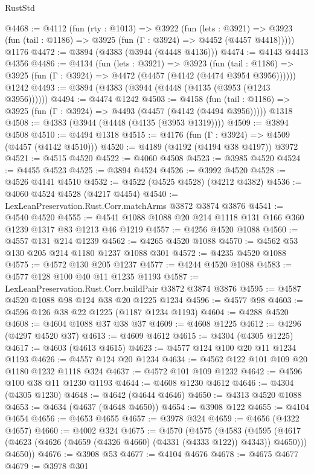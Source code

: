 \begin{lexlean}{RustStd}
\begin{coremodule}
@4468 := @4112
    (fun (rty : @1013) =>
    @3922
      (fun (lets : @3921) =>
      @3923 (fun (tail : @1186) => @3925 (fun (Γ : @3924) => @4452 (@4457 @4418)))))
    @1176
@4472 := @3894 (@4383 (@3944 (@4448 @4136)))
@4474 := @4143 @4413 @4356
@4486 := @4134
    (fun (lets : @3921) =>
    @3923
      (fun (tail : @1186) => @3925 (fun (Γ : @3924) => @4472 (@4457 (@4142 (@4474 @3954 @3956))))))
    @1242
@4493 := @3894 (@4383 (@3944 (@4448 (@4135 (@3953 (@1243 @3956))))))
@4494 := @4474 @1242
@4503 := @4158
    (fun (tail : @1186) => @3925 (fun (Γ : @3924) => @4493 (@4457 (@4142 (@4494 @3956)))))
    @1318
@4508 := @4383 (@3944 (@4448 (@4135 (@3953 @1319))))
@4509 := @3894 @4508
@4510 := @4494 @1318
@4515 := @4176 (fun (Γ : @3924) => @4509 (@4457 (@4142 @4510)))
@4520 := @4189 (@4192 (@4194 @38 @4197)) @3972
@4521 := @4515 @4520
@4522 := @4060 @4508
@4523 := @3985 @4520
@4524 := @4455 @4523
@4525 := @3894 @4524
@4526 := @3992 @4520
@4528 := @4526 @4141 @4510
@4532 := @4522 (@4525 @4528) (@4212 @4382)
@4536 := @4060 @4524 @4528 (@4217 @4454)
@4540 := LexLeanPreservation.Rust.Corr.matchArms @3872 @3874 @3876
@4541 := @4540 @4520
@4555 := @4541 @1088 @1088 @20 @214 @1118 @131 @166 @360 @1239 @1317 @83 @1213 @46 @1219
@4557 := @4256 @4520 @1088
@4560 := @4557 @131 @214 @1239
@4562 := @4265 @4520 @1088
@4570 := @4562 @53 @130 @205 @214 @1180 @1237 @1088 @301
@4572 := @4235 @4520 @1088
@4575 := @4572 @130 @205 @1237
@4577 := @4244 @4520 @1088
@4583 := @4577 @128 @100 @40 @11 @1235 @1193
@4587 := LexLeanPreservation.Rust.Corr.buildPair @3872 @3874 @3876
@4595 := @4587 @4520 @1088 @98 @124 @38 @20 @1225 @1234
@4596 := @4577 @98
@4603 := @4596 @126 @38 @22 @1225 (@1187 @1234 @1193)
@4604 := @4288 @4520
@4608 := @4604 @1088 @37 @38 @37
@4609 := @4608 @1225
@4612 := @4296 (@4297 @4520 @37)
@4613 := @4609 @4612
@4615 := @4304 (@4305 @1225)
@4617 := @4603 (@4613 @4615)
@4623 := @4577 @124 @100 @20 @11 @1234 @1193
@4626 := @4557 @124 @20 @1234
@4634 := @4562 @122 @101 @109 @20 @1180 @1232 @1118 @324
@4637 := @4572 @101 @109 @1232
@4642 := @4596 @100 @38 @11 @1230 @1193
@4644 := @4608 @1230 @4612
@4646 := @4304 (@4305 @1230)
@4648 := @4642 (@4644 @4646)
@4650 := @4313 @4520 @1088
@4653 := @4634 (@4637 (@4648 @4650))
@4654 := @3908 @122
@4655 := @4104 @4654
@4656 := @4653 @4655
@4657 := @3978 @324
@4659 := @4656 (@4322 @4657)
@4660 := @4002 @324
@4675 := @4570
    (@4575
      (@4583
        (@4595 (@4617 (@4623 (@4626 (@4659 (@4326 @4660) (@4331 (@4333 @122)) @4343)) @4650)))
        @4650))
@4676 := @3908 @53
@4677 := @4104 @4676
@4678 := @4675 @4677
@4679 := @3978 @301

\end{coremodule}
\end{lexlean}
